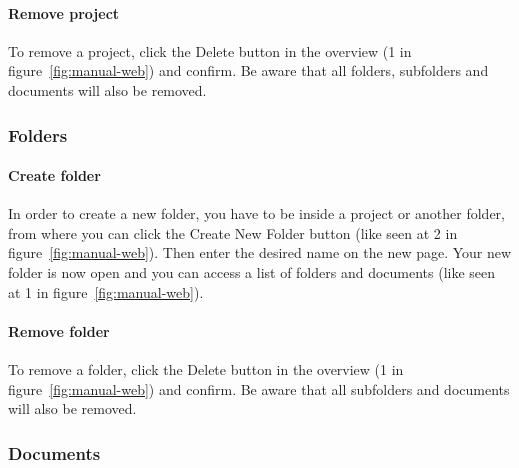 	\paragraph{Remove project}
	To remove a project, click the Delete button in the overview (1 in figure~\ref{fig:manual-web}) and confirm. Be aware that all folders, subfolders and documents will also be removed.

\subsubsection{Folders}

	\paragraph{Create folder}
	In order to create a new folder, you have to be inside a project or another folder, from where you can click the Create New Folder button (like seen at 2 in figure~\ref{fig:manual-web}). Then enter the desired name on the new page. Your new folder is now open and you can access a list of folders and documents (like seen at 1 in figure~\ref{fig:manual-web}).

	\paragraph{Remove folder}
	To remove a folder, click the Delete button in the overview (1 in figure~\ref{fig:manual-web}) and confirm. Be aware that all subfolders and documents will also be removed.

\subsubsection{Documents}
	
